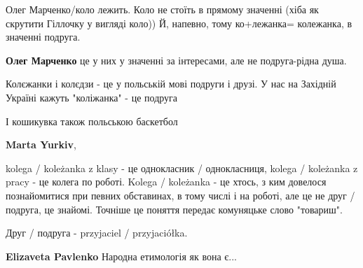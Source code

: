 \begin{itemize}
\begin{itemize}
Олег Марченко/коло лежить.
Коло не стоїть в прямому значенні (хіба як скрутити
Гіллочку у вигляді коло))
Й, напевно, тому ко+лежанка=
колежанка, в значенні подруга.

 
\textbf{Олег Марченко} це у них у значенні за інтересами, але не подруга-рідна душа.

 
Колєжанки і колєдзи - це у польській мові подруги і друзі. У нас на Західній Україні кажуть "коліжанка" - це подруга

 
І кошикувка також польською баскетбол

 
\textbf{Marta Yurkiv}, 

kolega / koleżanka z klasy - це однокласник / однокласниця, kolega / koleżanka
z pracy - це колега по роботі. Kolega / koleżanka - це хтось, з ким довелося
познайомитися при певних обставинах, в тому числі і на роботі, але це не друг /
подруга, це знайомі. Точніше це поняття передає комуняцьке слово "товариш".

Друг / подруга - przyjaciel / przyjaciółka.

 
\textbf{Elizaveta Pavlenko} Народна етимологія як вона є... 🤕


\end{itemize}
\end{itemize}
